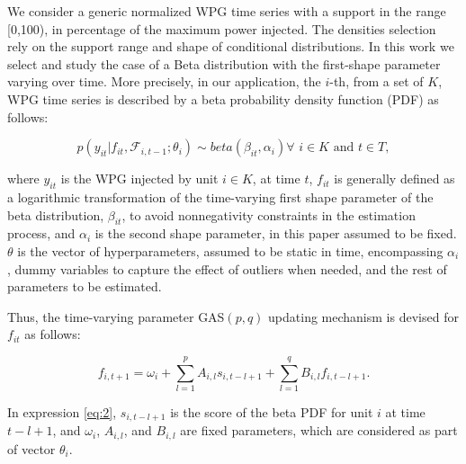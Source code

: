 \documentclass[a4paper]{IEEEtran}
\begin{document}
We consider a generic normalized WPG time series with a support in the range [0,100), in percentage of the maximum power injected. The densities selection rely on the support range and shape of conditional distributions. In this work we select and study the case of a Beta distribution with the first-shape parameter varying over time. More precisely, in our application, the $i$-th, from a set of $K$, WPG time series is described by a beta probability density function (PDF) as follows:

\begin{equation}
p(y_{it}|f_{it},\mathcal{F}_{i,t-1};\theta_i) \sim beta\left(\beta_{it},\alpha_{i}\right) \forall\,\, i \in K \,\, \mbox{and}\,\, t \in T, \label{beta_dens}
\end{equation}

\noindent
where $y_{it}$ is the WPG injected by unit $i\in K$, at time $t$, $f_{it}$ is generally defined as a logarithmic transformation of the time-varying first shape parameter of the beta distribution, $\beta_{it}$, to avoid nonnegativity constraints in the estimation process, and $\alpha_i$ is the second shape parameter, in this paper assumed to be fixed. $\theta$ is the vector of hyperparameters, assumed to be static in time, encompassing $\alpha_i$, dummy variables to capture the effect of outliers when needed, and the rest of parameters to be estimated.

Thus, the time-varying parameter GAS$(p,q)$ updating mechanism is devised for $f_{it}$ as follows:

\vspace{-0.3cm}
\begin{equation}
{f}_{i,t+1} = \omega_i + \sum_{l=1}^{p} A_{i,l}s_{i,t-l+1} + \sum_{l=1}^{q} B_{i,l}f_{i,t-l+1}. \label{eq:2}
\end{equation}

\noindent
In expression \eqref{eq:2}, $s_{i,t-l+1}$ is the score of the beta PDF for unit $i$ at time $t-l+1$, and $\omega_i$, $A_{i,l}$, and $B_{i,l}$ are fixed parameters, which are considered as part of vector $\theta_i$. %
\end{document}
